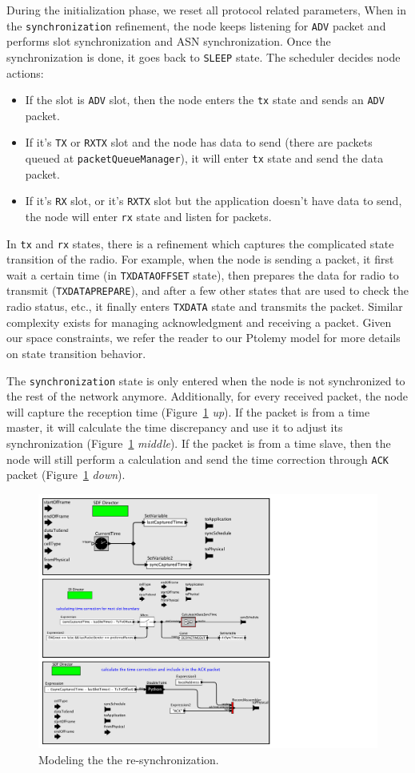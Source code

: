 During the initialization phase, we reset all protocol related parameters, When in the \texttt{synchronization} refinement, the node keeps listening for \texttt{ADV} packet and performs slot synchronization and ASN synchronization. Once the synchronization is done, it goes back to \texttt{SLEEP} state.
The scheduler decides node actions: 
\begin{itemize}
\item If the slot is \texttt{ADV} slot, then the node enters the \texttt{tx} state and sends an \texttt{ADV} packet. 
\item If it's \texttt{TX} or \texttt{RXTX} slot and the node has data to send (there are packets queued at \texttt{packetQueueManager}), it will enter \texttt{tx} state and send the data packet. 
\item If it's \texttt{RX} slot, or it's \texttt{RXTX} slot but the application doesn't have data to send, the node will enter \texttt{rx} state and listen for packets.
\end{itemize}

In \texttt{tx} and \texttt{rx} states, there is a refinement which captures the complicated state transition of the radio. For example, when the node is sending a packet, it first wait a certain time (in \texttt{TXDATAOFFSET} state), then prepares the data for radio to transmit (\texttt{TXDATAPREPARE}), and after a few other states that are used to check the radio status, etc., it finally enters \texttt{TXDATA} state and transmits the packet. Similar complexity exists for managing acknowledgment and receiving a packet. Given our space constraints, we refer the reader to our Ptolemy model for more details on state transition behavior.

The \texttt{synchronization} state is only entered when the node is not synchronized to the rest of the network anymore. Additionally, for every received packet, the node will capture the reception time (Figure~\ref{fig:timeCorrection} {\em up}). If the packet is from a time master, it will calculate the time discrepancy and use it to adjust its synchronization (Figure~\ref{fig:timeCorrection} {\em middle}). If the packet is from a time slave, then the node will still perform a calculation and send the time correction through \texttt{ACK} packet (Figure~\ref{fig:timeCorrection} {\em down}).

\begin{figure}[t]
\centering
\includegraphics[width=0.9\columnwidth]{figures/PaperReSynchronization}
\caption{Modeling the the re-synchronization.}
\label{fig:timeCorrection}
\end{figure}

